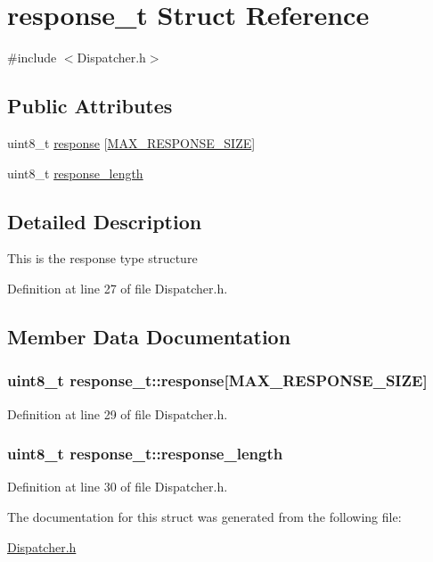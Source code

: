 \hypertarget{structresponse__t}{\section{response\-\_\-t \-Struct \-Reference}
\label{structresponse__t}
}


{\ttfamily \#include $<$\-Dispatcher.\-h$>$}

\subsection*{\-Public \-Attributes}
\begin{DoxyCompactItemize}
\item 
uint8\-\_\-t \hyperlink{structresponse__t_a2cc532437f164e1982a25e51aedcd09d}{response} \mbox{[}\hyperlink{_dispatcher_8h_a836f11ea44075aa0ac768c646e40adaa}{\-M\-A\-X\-\_\-\-R\-E\-S\-P\-O\-N\-S\-E\-\_\-\-S\-I\-Z\-E}\mbox{]}
\item 
uint8\-\_\-t \hyperlink{structresponse__t_aeaab0ceac7abfb8698b31a02f8f9bf36}{response\-\_\-length}
\end{DoxyCompactItemize}


\subsection{\-Detailed \-Description}
\-This is the response type structure 

\-Definition at line 27 of file \-Dispatcher.\-h.



\subsection{\-Member \-Data \-Documentation}
\hypertarget{structresponse__t_a2cc532437f164e1982a25e51aedcd09d}{
\subsubsection[{response}]{\setlength{\rightskip}{0pt plus 5cm}uint8\-\_\-t {\bf response\-\_\-t\-::response}\mbox{[}{\bf \-M\-A\-X\-\_\-\-R\-E\-S\-P\-O\-N\-S\-E\-\_\-\-S\-I\-Z\-E}\mbox{]}}}\label{structresponse__t_a2cc532437f164e1982a25e51aedcd09d}


\-Definition at line 29 of file \-Dispatcher.\-h.

\hypertarget{structresponse__t_aeaab0ceac7abfb8698b31a02f8f9bf36}{
\subsubsection[{response\-\_\-length}]{\setlength{\rightskip}{0pt plus 5cm}uint8\-\_\-t {\bf response\-\_\-t\-::response\-\_\-length}}}\label{structresponse__t_aeaab0ceac7abfb8698b31a02f8f9bf36}


\-Definition at line 30 of file \-Dispatcher.\-h.



\-The documentation for this struct was generated from the following file\-:\begin{DoxyCompactItemize}
\item 
\hyperlink{_dispatcher_8h}{\-Dispatcher.\-h}\end{DoxyCompactItemize}
